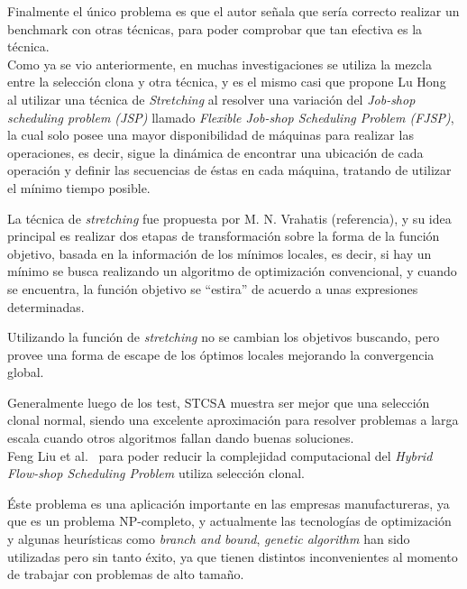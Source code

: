 Finalmente el único problema es que el autor señala que sería correcto realizar un benchmark con otras técnicas,
para poder comprobar que tan efectiva es la técnica.\\


Como ya se vio anteriormente, en muchas investigaciones se utiliza la mezcla entre la selección clona y otra técnica,
y es el mismo casi que propone Lu Hong~\cite{jobshop} al utilizar una técnica de \emph{Stretching} al resolver
una variación del \emph{Job-shop scheduling problem (JSP)} llamado \emph{Flexible Job-shop Scheduling Problem (FJSP)},
la cual solo posee una mayor disponibilidad de máquinas para realizar las operaciones, es decir, sigue la dinámica
de encontrar una ubicación de cada operación y definir las secuencias de éstas en cada máquina, tratando de utilizar el mínimo
tiempo posible.

La técnica de \emph{stretching} fue propuesta por M. N. Vrahatis (referencia),
y su idea principal es realizar dos etapas de transformación sobre la forma de la función objetivo,
basada en la información de los mínimos locales, es decir, si hay un mínimo se busca realizando un algoritmo
de optimización convencional, y cuando se encuentra, la función objetivo se ``estira'' de acuerdo a unas expresiones determinadas.

Utilizando la función de \emph{stretching} no se cambian los objetivos buscando, pero provee una forma de escape
de los óptimos locales mejorando la convergencia global.

Generalmente luego de los test, STCSA muestra ser mejor que una selección clonal normal,
siendo una excelente aproximación para resolver problemas a larga escala cuando otros algoritmos fallan dando buenas soluciones.\\


Feng Liu et al.~\cite{flowshop} para poder reducir la complejidad computacional del
\emph{Hybrid Flow-shop Scheduling Problem} utiliza selección clonal.

Éste problema es una aplicación importante en las empresas manufactureras, ya que es un problema NP-completo,
y actualmente las tecnologías de optimización y algunas heurísticas como \emph{branch and bound}, \emph{genetic algorithm}
han sido utilizadas pero sin tanto éxito, ya que tienen distintos inconvenientes al momento de trabajar con problemas
de alto tamaño.


